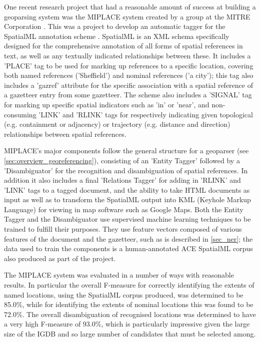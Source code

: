 \documentclass[12pt, a4paper]{report}
\begin{document}
One recent research project that had a reasonable amount of success at building a geoparsing system was the MIPLACE system created by a group at the MITRE Corporation \citep{mani2010}. This was a project to develop an automatic tagger for the SpatialML annotation scheme \citep{spatialml2009}. SpatialML is an XML schema specifically designed for the comprehensive annotation of all forms of spatial references in text, as well as any textually indicated relationships between these. It includes a 'PLACE' tag to be used for marking up references to a specific location, covering both named references ('Sheffield') and nominal references ('a city'); this tag also includes a 'gazref' attribute for the specific association with a spatial reference of a gazetteer entry from some gazetteer. The scheme also includes a 'SIGNAL' tag for marking up specific spatial indicators such as 'in' or 'near', and non-consuming 'LINK' and 'RLINK' tags for respectively indicating given topological (e.g. containment or adjacency) or trajectory (e.g. distance and direction) relationships  between  spatial references.

MIPLACE's major components follow the general structure for a geoparser (see \ref{sec:overview_georeferencing}), consisting of an 'Entity Tagger' followed by a 'Disambiguator' for the recognition and disambiguation of spatial references. In addition it also includes a final 'Relations Tagger' for adding in 'RLINK' and 'LINK' tags to a tagged document, and the ability to take HTML documents as input as well as to transform the SpatialML output into KML (Keyhole Markup Language) for viewing in map software such as Google Maps. Both the Entity Tagger and the Disambiguator use supervised machine learning techniques to be trained to fulfill their purposes. They use feature vectors composed of various features of the document and the gazetteer, such as is described in \ref{sec_ner}; the data used to train the components is a human-annotated ACE SpatialML corpus also produced as part of the project.


The MIPLACE system was evaluated in a number of ways with reasonable results. In particular the overall F-measure for correctly identifying the extents of named locations, using the SpatialML corpus produced, was determined to be 85.0\%, while for identifying the extents of nominal locations this was found to be 72.0\%. The overall disambiguation of recognised locations was determined to have a very high F-measure of 93.0\%, which is particularly impressive given the large size of the IGDB and so large number of candidates that must be selected among.
\end{document}
